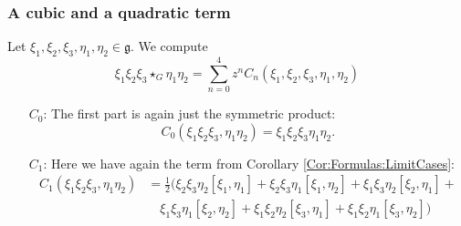 \subsubsection*{A cubic and a quadratic term}
Let $\xi_1, \xi_2, \xi_3, \eta_1, \eta_2 \in \mathfrak{g}$. We compute
\begin{equation*}
	\xi_1 \xi_2 \xi_3 \star_G \eta_1 \eta_2
	= 
	\sum\limits_{n = 0}^4
	z^n C_n(\xi_1, \xi_2, \xi_3, \eta_1, \eta_2)
\end{equation*}
\begin{itemize}
	\item[$C_0$:]
	The first part is again just the symmetric product:
	\begin{equation*}
		C_0(\xi_1 \xi_2 \xi_3, \eta_1 \eta_2)
		=
		\xi_1 \xi_2 \xi_3 \eta_1 \eta_2.
	\end{equation*}
	
	\item[$C_1$:]
	Here we have again the term from Corollary \ref{Cor:Formulas:LimitCases}:
	\begin{align*}
		C_1(\xi_1 \xi_2 \xi_3, \eta_1 \eta_2)
		& =
		\frac{1}{2} 
		\big( 
			\xi_2 \xi_3 \eta_2 [\xi_1, \eta_1] + 
			\xi_2 \xi_3 \eta_1 [\xi_1, \eta_2] + 
			\xi_1 \xi_3 \eta_2 [\xi_2, \eta_1] +
		\\
		& \quad 
			\xi_1 \xi_3 \eta_1 [\xi_2, \eta_2] + 
			\xi_1 \xi_2 \eta_2 [\xi_3, \eta_1] + 
			\xi_1 \xi_2 \eta_1 [\xi_3, \eta_2] 
 		\big)
	\end{align*}


\end{itemize}
